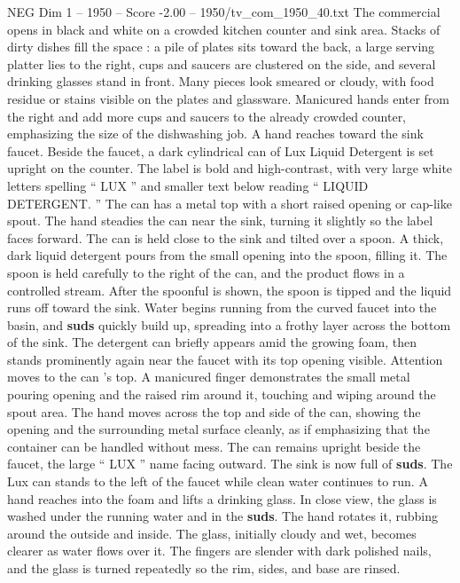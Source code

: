 \begin{textsample}{NEG Dim 1 – 1950 – Score -2.00 – 1950/tv\_com\_1950\_40.txt}  \label{ex:f1_neg_014}
The commercial opens in black and white on a crowded kitchen counter and sink area.
Stacks of dirty dishes fill the space : a pile of plates sits toward the back, a large serving platter lies to the right, cups and saucers are clustered on the side, and several drinking glasses stand in front.
Many pieces look smeared or cloudy, with food residue or stains visible on the plates and glassware.
Manicured hands enter from the right and add more cups and saucers to the already crowded counter, emphasizing the size of the dishwashing job.
A hand reaches toward the sink faucet.
Beside the faucet, a dark cylindrical can of Lux Liquid Detergent is set upright on the counter.
The label is bold and high-contrast, with very large white letters spelling “ LUX ” and smaller text below reading “ LIQUID DETERGENT. ” The can has a metal top with a short raised opening or cap-like spout.
The hand steadies the can near the sink, turning it slightly so the label faces forward.
The can is held close to the sink and tilted over a spoon.
A thick, dark liquid detergent pours from the small opening into the spoon, filling it.
The spoon is held carefully to the right of the can, and the product flows in a controlled stream.
After the spoonful is shown, the spoon is tipped and the liquid runs off toward the sink.
Water begins running from the curved faucet into the basin, and \textbf{suds} quickly build up, spreading into a frothy layer across the bottom of the sink.
The detergent can briefly appears amid the growing foam, then stands prominently again near the faucet with its top opening visible.
Attention moves to the can ’s top.
A manicured finger demonstrates the small metal pouring opening and the raised rim around it, touching and wiping around the spout area.
The hand moves across the top and side of the can, showing the opening and the surrounding metal surface cleanly, as if emphasizing that the container can be handled without mess.
The can remains upright beside the faucet, the large “ LUX ” name facing outward.
The sink is now full of \textbf{suds}.
The Lux can stands to the left of the faucet while clean water continues to run.
A hand reaches into the foam and lifts a drinking glass.
In close view, the glass is washed under the running water and in the \textbf{suds}.
The hand rotates it, rubbing around the outside and inside.
The glass, initially cloudy and wet, becomes clearer as water flows over it.
The fingers are slender with dark polished nails, and the glass is turned repeatedly so the rim, sides, and base are rinsed.

\end{textsample}
